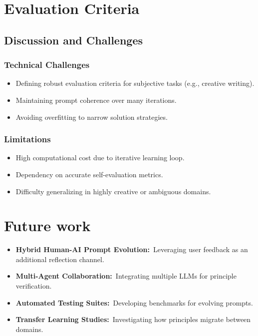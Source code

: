 \documentclass[10pt,a4paper,twocolumn]{article}
\begin{document}
\section{Evaluation Criteria} 


\subsection{Discussion and Challenges}




\subsubsection{Technical Challenges}



\begin{itemize}
    \item Defining robust evaluation criteria for subjective tasks (e.g., creative writing).
    \item Maintaining prompt coherence over many iterations.
    \item Avoiding overfitting to narrow solution strategies.
\end{itemize}



\subsubsection{Limitations}


\begin{itemize}
    \item High computational cost due to iterative learning loop.
    \item Dependency on accurate self-evaluation metrics.
    \item Difficulty generalizing in highly creative or ambiguous domains.

\end{itemize}






\section{{Future work} }







\begin{itemize}
    \item \textbf{Hybrid Human-AI Prompt Evolution:} Leveraging user feedback as an additional reflection channel.
    \item \textbf{Multi-Agent Collaboration:} Integrating multiple LLMs for principle verification.
    \item \textbf{Automated Testing Suites:} Developing benchmarks for evolving prompts.
    \item \textbf{Transfer Learning Studies:} Investigating how principles migrate between domains.
\end{itemize}
\end{document}
